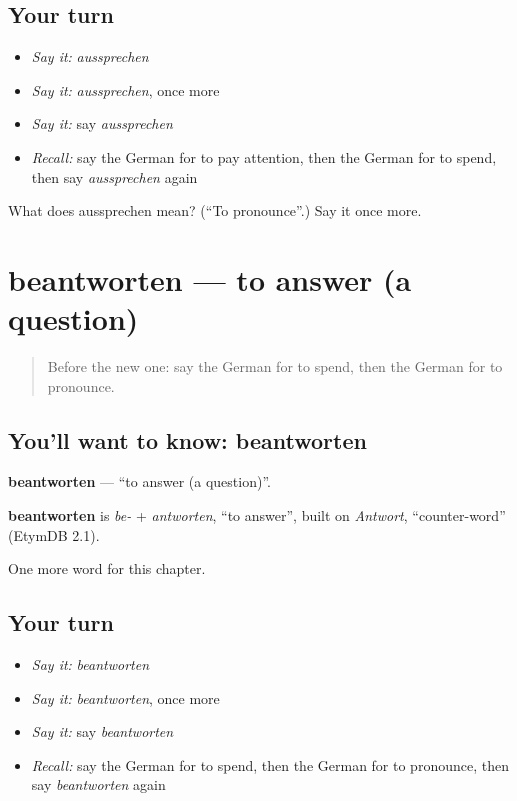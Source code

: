 \subsection*{Your turn}
\begin{itemize}
\raggedright
  \item \emph{Say it:} \emph{aussprechen}
  \item \emph{Say it:} \emph{aussprechen}, once more
  \item \emph{Say it:} say \emph{aussprechen}
  \item \emph{Recall:} say the German for to pay attention, then the German for to spend, then say \emph{aussprechen} again
\end{itemize}

\begin{tcolorbox}[breakable,colback=teal!4,colframe=teal!35!black,title={Before you move on}]
What does aussprechen mean? (\textquotedblleft{}To pronounce\textquotedblright{}.) Say it once more.
\end{tcolorbox}
\section[beantworten]{beantworten — to answer (a question)}

\label{lesson:GE-C245-beantworten}



\begin{quote}
Before the new one: say the German for to spend, then the German for to pronounce.
\end{quote}

\subsection*{You'll want to know: beantworten}
\textbf{beantworten} — \textquotedblleft{}to answer (a question)\textquotedblright{}.

\begin{cousinweb}
\textbf{beantworten} is \emph{be-} + \emph{antworten}, \textquotedblleft{}to answer\textquotedblright{}, built on \emph{Antwort}, \textquotedblleft{}counter-word\textquotedblright{} (EtymDB 2.1).
\end{cousinweb}

\begin{grammarlens}[title={What you've built}]
One more word for this chapter.
\end{grammarlens}

\subsection*{Your turn}
\begin{itemize}
\raggedright
  \item \emph{Say it:} \emph{beantworten}
  \item \emph{Say it:} \emph{beantworten}, once more
  \item \emph{Say it:} say \emph{beantworten}
  \item \emph{Recall:} say the German for to spend, then the German for to pronounce, then say \emph{beantworten} again
\end{itemize}

